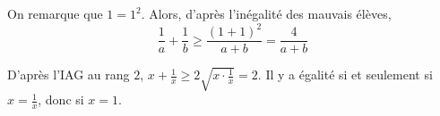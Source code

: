 \begin{sol}
On remarque que $1 = 1^2$. Alors, d'après l'inégalité des mauvais élèves,
$$\frac 1a + \frac 1b \ge \frac{(1+1)^2}{a+b} = \frac 4{a+b}$$
\end{sol}

\begin{sol}
D'après l'IAG au rang $2$, $x + \frac 1x \ge 2 \sqrt{x \cdot \frac 1x} = 2$. Il y a égalité si et seulement si $x = \frac 1x$, donc si $x = 1$.
\end{sol}
